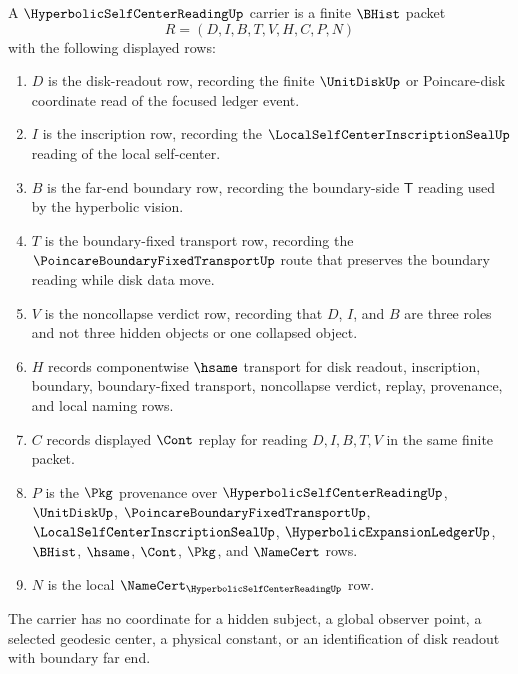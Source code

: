 \begin{definition}
\label{def:hyperbolic-self-center-reading-carrier}
A $\HyperbolicSelfCenterReadingUp$ carrier is a finite $\BHist$ packet
$$
R=(D,I,B,T,V,H,C,P,N)
$$
with the following displayed rows:
\begin{enumerate}
\item $D$ is the disk-readout row, recording the finite $\UnitDiskUp$ or Poincare-disk coordinate read of the focused ledger event.
\item $I$ is the inscription row, recording the $\LocalSelfCenterInscriptionSealUp$ reading of the local self-center.
\item $B$ is the far-end boundary row, recording the boundary-side $\mathsf{T}$ reading used by the hyperbolic vision.
\item $T$ is the boundary-fixed transport row, recording the $\PoincareBoundaryFixedTransportUp$ route that preserves the boundary reading while disk data move.
\item $V$ is the noncollapse verdict row, recording that $D$, $I$, and $B$ are three roles and not three hidden objects or one collapsed object.
\item $H$ records componentwise $\hsame$ transport for disk readout, inscription, boundary, boundary-fixed transport, noncollapse verdict, replay, provenance, and local naming rows.
\item $C$ records displayed $\Cont$ replay for reading $D,I,B,T,V$ in the same finite packet.
\item $P$ is the $\Pkg$ provenance over $\HyperbolicSelfCenterReadingUp$, $\UnitDiskUp$, $\PoincareBoundaryFixedTransportUp$, $\LocalSelfCenterInscriptionSealUp$, $\HyperbolicExpansionLedgerUp$, $\BHist$, $\hsame$, $\Cont$, $\Pkg$, and $\NameCert$ rows.
\item $N$ is the local $\NameCert_{\HyperbolicSelfCenterReadingUp}$ row.
\end{enumerate}
The carrier has no coordinate for a hidden subject, a global observer point, a selected geodesic center, a physical constant, or an identification of disk readout with boundary far end.
\end{definition}

